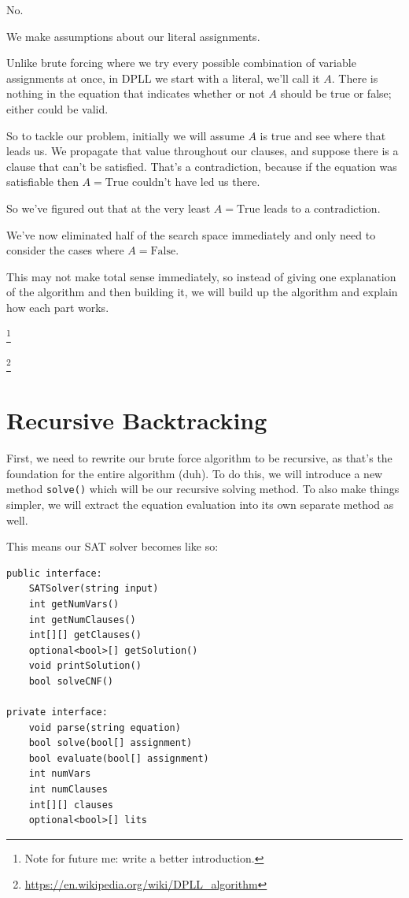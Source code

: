 No.

We make assumptions about our literal assignments.

Unlike brute forcing where we try every possible combination of variable
assignments at once, in DPLL we start with a literal, we'll call it $A$. There is
nothing in the equation that indicates whether or not $A$ should be true or
false; either could be valid.

So to tackle our problem, initially we will assume $A$ is true and see where
that leads us. We propagate that value throughout our clauses, and suppose
there is a clause that can't be satisfied. That's a contradiction, because if the
equation was satisfiable then $A = \text{True}$ couldn't have led us there.

So we've figured out that at the very least $A = \text{True}$ leads to a
contradiction.

We've now eliminated half of the search space immediately and only need to
consider the cases where $A = \text{False}$.

This may not make total sense immediately, so instead of giving one explanation
of the algorithm and then building it, we will build up the algorithm and explain
how each part works.

\footnote{Note for future me: write a better introduction.}

\footnote{\url{https://en.wikipedia.org/wiki/DPLL_algorithm}}

\section{Recursive Backtracking}

First, we need to rewrite our brute force algorithm to be recursive, as that's
the foundation for the entire algorithm (duh). To do this, we will introduce a
new method \texttt{solve()} which will be our recursive solving method. To
also make things simpler, we will extract the equation evaluation into its own
separate method as well.

This means our SAT solver becomes like so:

\begin{lstlisting}
public interface:
    SATSolver(string input)
    int getNumVars()
    int getNumClauses()
    int[][] getClauses()
    optional<bool>[] getSolution()
    void printSolution()
    bool solveCNF()

private interface:
    void parse(string equation)
    bool solve(bool[] assignment)
    bool evaluate(bool[] assignment)
    int numVars
    int numClauses
    int[][] clauses
    optional<bool>[] lits
\end{lstlisting}

